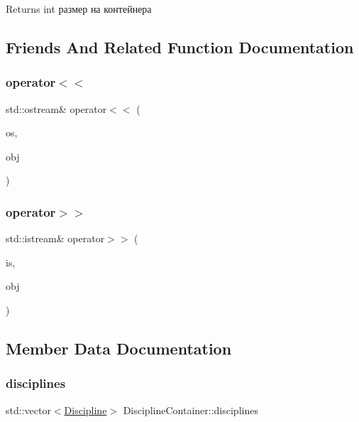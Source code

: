 \begin{DoxyReturn}{Returns}
int размер на контейнера 
\end{DoxyReturn}


\subsection{Friends And Related Function Documentation}
\mbox{\label{class_discipline_container_a607f596b8da0b7ba4b4ac9c7052a4dc8}} 
\subsubsection{\texorpdfstring{operator$<$$<$}{operator<<}}
{\footnotesize\ttfamily std\+::ostream\& operator$<$$<$ (\begin{DoxyParamCaption}\item[{std\+::ostream \&}]{os,  }\item[{const \hyperlink{class_discipline_container}{Discipline\+Container} \&}]{obj }\end{DoxyParamCaption})\hspace{0.3cm}{\ttfamily [friend]}}

\mbox{\label{class_discipline_container_ae5ca1b37f6cd35db450f74531fb500d3}} 
\subsubsection{\texorpdfstring{operator$>$$>$}{operator>>}}
{\footnotesize\ttfamily std\+::istream\& operator$>$$>$ (\begin{DoxyParamCaption}\item[{std\+::istream \&}]{is,  }\item[{\hyperlink{class_discipline_container}{Discipline\+Container} \&}]{obj }\end{DoxyParamCaption})\hspace{0.3cm}{\ttfamily [friend]}}



\subsection{Member Data Documentation}
\mbox{\label{class_discipline_container_aa751d8be73af398d0f08514954b352ca}} 
\subsubsection{\texorpdfstring{disciplines}{disciplines}}
{\footnotesize\ttfamily std\+::vector$<$\hyperlink{class_discipline}{Discipline}$>$ Discipline\+Container\+::disciplines\hspace{0.3cm}{\ttfamily [private]}}

